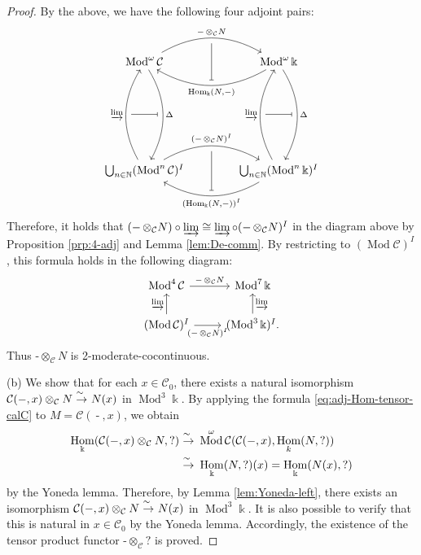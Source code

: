 \documentclass{surv-l}
\numberwithin{equation}{chapter}
\numberwithin{figure}{chapter}
\theoremstyle{plain}
\theoremstyle{definition}
\theoremstyle{remark}
\newcommand{\isoto}{\
  \raise.8ex\hbox{$^{\sim}$}\kern-.7em\hbox{$\to$}\ }
\newcommand{\Ar}[3]{\ar[from={#1}, to={#2}, #3]}
\DeclareMathOperator{\Hom}{Hom}
\DeclareMathOperator{\Mod}{Mod}
\DeclareMathOperator{\blank}{-}
\begin{document}
\begin{proof}
By the above, we have the following four adjoint pairs:
\[
\begin{tikzcd}[row sep=8em, column sep=4em]
\Mod^\omega{\mathcal{C}} \ar[r, bend left, "\blank\otimes_{\mathcal{C}} N", ""'{name=D-l}] \ar[d, bend left, "\Delta", ""'{name=L-g}]
& \Mod^\omega\Bbbk \ar[l, bend left, "{\Hom_\Bbbk(N,\blank)}", ""'{name=U-r}] \ar[d, bend left, "\Delta", ""'{name=L-g'}]\\
\bigcup_{n \in \mathbb{N}}(\Mod^n{\mathcal{C}})^I \ar[r, bend left, "(\blank\otimes_{\mathcal{C}} N)^I", ""'{name=D-l'}] \ar[u, bend left, "\varinjlim", ""'{name=R-f}]
& \bigcup_{n \in \mathbb{N}}(\Mod^n\Bbbk)^I \ar[l, bend left, "({\Hom_\Bbbk(N,\blank)})^I", ""'{name=U-r'}] \ar[u, bend left, "\varinjlim", ""'{name=R-f'}]
\ar[r, from=D-l, to=U-r, mapsfrom, no tail]
\ar[r, from=D-l', to=U-r', mapsfrom, no tail]
\ar[r, from=R-f, to=L-g, mapsfrom, no tail]
\ar[r, from=R-f', to=L-g', mapsfrom, no tail]
\end{tikzcd}
\]
Therefore, it holds that
$(\blank\otimes_{\mathcal{C}} N)\circ \varinjlim \cong \varinjlim \circ (\blank\otimes_{\mathcal{C}} N)^I$
in the diagram above by
Proposition \ref{prp:4-adj} and Lemma \ref{lem:De-comm}.
By restricting to $(\Mod {\mathcal{C}})^I$, this formula holds
in the following diagram:
\[
\begin{tikzcd}
\Mod^4{\mathcal{C}} & \Mod^7\Bbbk\\
(\Mod {\mathcal{C}})^I & (\Mod^3\Bbbk)^I.
\Ar{1-1}{1-2}{"\blank\otimes_{\mathcal{C}} N"}
\Ar{2-1}{2-2}{"(\blank\otimes_{\mathcal{C}} N)^I" '}
\Ar{2-1}{1-1}{"\varinjlim"}
\Ar{2-2}{1-2}{"\varinjlim" '}
\end{tikzcd}
\]
Thus $\blank\otimes_{\mathcal{C}} N$ is 2-moderate-cocontinuous.

(b) We show that for each $x \in {\mathcal{C}}_0$,
there exists a natural isomorphism
${\mathcal{C}}(\blank, x) \otimes_{\mathcal{C}} N \isoto N(x)$
in $\Mod^3\Bbbk$.
By applying the formula \eqref{eq:adj-Hom-tensor-calC}
to $M = {\mathcal{C}}(\blank, x)$, we obtain
\[
\begin{aligned}
\Hom_\Bbbk({\mathcal{C}}(\blank, x)\otimes_{\mathcal{C}} N, ?) &\isoto \Mod^\omega{\mathcal{C}} ({\mathcal{C}}(\blank, x),\Hom_k(N, ?))\\
&\isoto \Hom_\Bbbk(N,?)(x) = \Hom_\Bbbk(N(x), ?)
\end{aligned}
\]
by the Yoneda lemma.
Therefore, by Lemma \ref{lem:Yoneda-left},
there exists an isomorphism ${\mathcal{C}}(\blank, x) \otimes_{\mathcal{C}} N \isoto N(x)$
in $\Mod^3\Bbbk$.
It is also possible to verify that this is natural in
$x \in {\mathcal{C}}_0$ by the Yoneda lemma.
Accordingly, the existence of the tensor product functor $\blank \otimes_{\mathcal{C}} ?$ is proved.



\end{proof}
\end{document}
